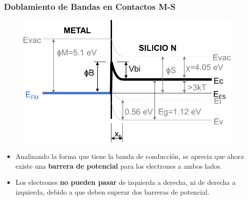 \documentclass[10pt,t,aspectratio=169]{beamer}
\begin{document}
\begin{frame}[t]
    \frametitle{Doblamiento de Bandas en Contactos M-S}

    \begin{figure}[t]
        \includegraphics[scale=0.6]{./figures/contacto-MS-5.pdf}
    \end{figure}

    \begin{itemize}
        \item Analizando la forma que tiene la banda de conducción, se aprecia que ahora existe una \textbf{barrera de potencial} para los electrones a ambos lados.
        \item Los electrones \textbf{no pueden pasar} de izquierda a derecha, ni de derecha a izquierda, debido a que deben superar dos barreras de potencial.
    \end{itemize}
\end{frame}
\end{document}
